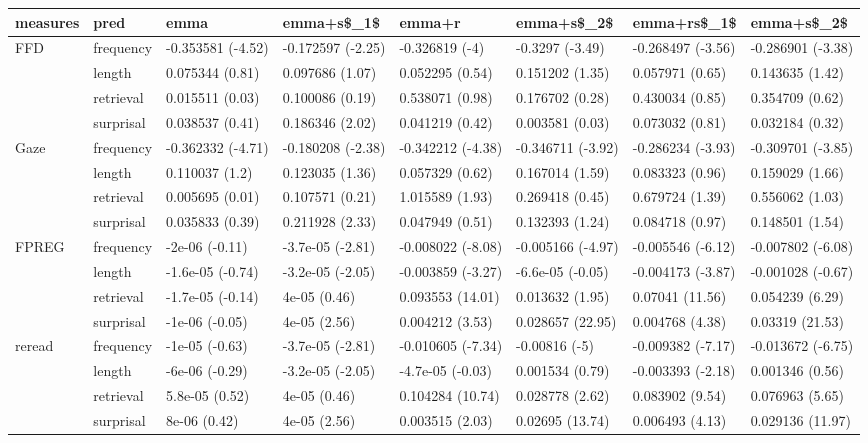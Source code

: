 \begin{table}[ht]
\begin{center}
\begin{tabular}{llllllll}
  \hline
measures & pred & emma & emma+s\$\_1\$ & emma+r & emma+s\$\_2\$ & emma+rs\$\_1\$ & emma+s\$\_2\$ \\ 
  \hline
FFD & frequency & -0.353581 (-4.52) & -0.172597 (-2.25) & -0.326819 (-4) & -0.3297 (-3.49) & -0.268497 (-3.56) & -0.286901 (-3.38) \\ 
    & length & 0.075344 (0.81) & 0.097686 (1.07) & 0.052295 (0.54) & 0.151202 (1.35) & 0.057971 (0.65) & 0.143635 (1.42) \\ 
    & retrieval & 0.015511 (0.03) & 0.100086 (0.19) & 0.538071 (0.98) & 0.176702 (0.28) & 0.430034 (0.85) & 0.354709 (0.62) \\ 
    & surprisal & 0.038537 (0.41) & 0.186346 (2.02) & 0.041219 (0.42) & 0.003581 (0.03) & 0.073032 (0.81) & 0.032184 (0.32) \\ 
  Gaze & frequency & -0.362332 (-4.71) & -0.180208 (-2.38) & -0.342212 (-4.38) & -0.346711 (-3.92) & -0.286234 (-3.93) & -0.309701 (-3.85) \\ 
    & length & 0.110037 (1.2) & 0.123035 (1.36) & 0.057329 (0.62) & 0.167014 (1.59) & 0.083323 (0.96) & 0.159029 (1.66) \\ 
    & retrieval & 0.005695 (0.01) & 0.107571 (0.21) & 1.015589 (1.93) & 0.269418 (0.45) & 0.679724 (1.39) & 0.556062 (1.03) \\ 
    & surprisal & 0.035833 (0.39) & 0.211928 (2.33) & 0.047949 (0.51) & 0.132393 (1.24) & 0.084718 (0.97) & 0.148501 (1.54) \\ 
  FPREG & frequency & -2e-06 (-0.11) & -3.7e-05 (-2.81) & -0.008022 (-8.08) & -0.005166 (-4.97) & -0.005546 (-6.12) & -0.007802 (-6.08) \\ 
    & length & -1.6e-05 (-0.74) & -3.2e-05 (-2.05) & -0.003859 (-3.27) & -6.6e-05 (-0.05) & -0.004173 (-3.87) & -0.001028 (-0.67) \\ 
    & retrieval & -1.7e-05 (-0.14) & 4e-05 (0.46) & 0.093553 (14.01) & 0.013632 (1.95) & 0.07041 (11.56) & 0.054239 (6.29) \\ 
    & surprisal & -1e-06 (-0.05) & 4e-05 (2.56) & 0.004212 (3.53) & 0.028657 (22.95) & 0.004768 (4.38) & 0.03319 (21.53) \\ 
  reread & frequency & -1e-05 (-0.63) & -3.7e-05 (-2.81) & -0.010605 (-7.34) & -0.00816 (-5) & -0.009382 (-7.17) & -0.013672 (-6.75) \\ 
    & length & -6e-06 (-0.29) & -3.2e-05 (-2.05) & -4.7e-05 (-0.03) & 0.001534 (0.79) & -0.003393 (-2.18) & 0.001346 (0.56) \\ 
    & retrieval & 5.8e-05 (0.52) & 4e-05 (0.46) & 0.104284 (10.74) & 0.028778 (2.62) & 0.083902 (9.54) & 0.076963 (5.65) \\ 
    & surprisal & 8e-06 (0.42) & 4e-05 (2.56) & 0.003515 (2.03) & 0.02695 (13.74) & 0.006493 (4.13) & 0.029136 (11.97) \\ 
   \hline
\end{tabular}
\end{center}
\end{table}
